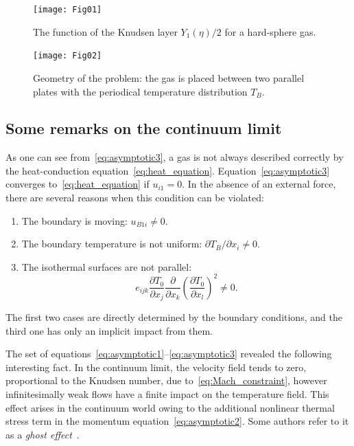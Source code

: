 \documentclass[smallextended, referee]{svjour3} %
\newcommand{\pder}[2][]{\frac{\partial#1}{\partial#2}}
\newcommand{\Pder}[2][]{\partial#1/\partial#2}
\begin{document}
\begin{figure}[ht]
    \centering
    \begin{minipage}{.48\textwidth}
        \centering
        \texttt{[image: Fig01]}
        \caption{The function of the Knudsen layer \(Y_1(\eta)/2\) for a hard-sphere gas.}
        \label{fig:Y1}
    \end{minipage}
    \quad
    \begin{minipage}{.48\textwidth}
        \centering
        \texttt{[image: Fig02]}
        \vspace{13pt}
        \caption{Geometry of the problem: the gas is placed between two parallel plates
            with the periodical temperature distribution \(T_B\).}
        \label{fig:geometry}
    \end{minipage}
\end{figure}

\subsection{Some remarks on the continuum limit}

As one can see from~\eqref{eq:asymptotic3}, a gas is not always described correctly
by the heat-conduction equation~\eqref{eq:heat_equation}.
Equation~\eqref{eq:asymptotic3} converges to~\eqref{eq:heat_equation} if \(u_{i1} = 0\).
In the absence of an external force, there are several reasons when this condition can be violated:
\begin{enumerate}
    \item The boundary is moving: \(u_{B1i} \neq 0 \).
    \item The boundary temperature is not uniform: \(\Pder[T_B]{x_i} \neq 0 \).
    \item The isothermal surfaces are not parallel:
        \begin{equation}\label{eq:equilibrium}
            e_{ijk}\pder[T_0]{x_j}\pder{x_k}\left(\pder[T_0]{x_l}\right)^2 \neq 0.
        \end{equation}
\end{enumerate}
The first two cases are directly determined by the boundary conditions,
and the third one has only an implicit impact from them.

The set of equations~\eqref{eq:asymptotic1}--\eqref{eq:asymptotic3} revealed the following interesting fact.
In the continuum limit, the velocity field tends to zero, proportional to the Knudsen number,
due to~\eqref{eq:Mach_constraint}, however infinitesimally weak flows
have a finite impact on the temperature field.
This effect arises in the continuum world owing to the additional nonlinear thermal stress term
in the momentum equation~\eqref{eq:asymptotic2}.
Some authors refer to it as a \emph{ghost effect}~\cite{Sone2002, Sone2007}.
\end{document}

